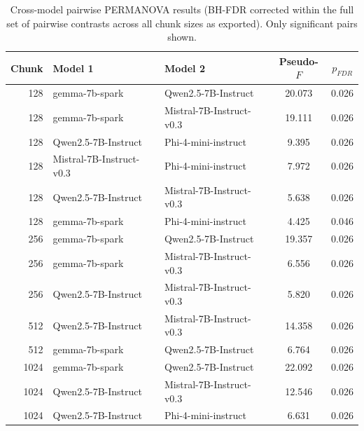 \begin{table}[H]
\centering
\caption{Cross-model pairwise PERMANOVA results (BH-FDR corrected within the full set of pairwise contrasts across all chunk sizes as exported). Only significant pairs shown.}
\label{tab:cross-permanova-pairwise-sig}
\small
\begin{tabular}{rllcc}
\toprule
Chunk & Model 1 & Model 2 & Pseudo-$F$ & $p_{FDR}$ \\
\midrule
128 & gemma-7b-spark & Qwen2.5-7B-Instruct & 20.073 & 0.026 \\
128 & gemma-7b-spark & Mistral-7B-Instruct-v0.3 & 19.111 & 0.026 \\
128 & Qwen2.5-7B-Instruct & Phi-4-mini-instruct & 9.395 & 0.026 \\
128 & Mistral-7B-Instruct-v0.3 & Phi-4-mini-instruct & 7.972 & 0.026 \\
128 & Qwen2.5-7B-Instruct & Mistral-7B-Instruct-v0.3 & 5.638 & 0.026 \\
128 & gemma-7b-spark & Phi-4-mini-instruct & 4.425 & 0.046 \\
256 & gemma-7b-spark & Qwen2.5-7B-Instruct & 19.357 & 0.026 \\
256 & gemma-7b-spark & Mistral-7B-Instruct-v0.3 & 6.556 & 0.026 \\
256 & Qwen2.5-7B-Instruct & Mistral-7B-Instruct-v0.3 & 5.820 & 0.026 \\
512 & Qwen2.5-7B-Instruct & Mistral-7B-Instruct-v0.3 & 14.358 & 0.026 \\
512 & gemma-7b-spark & Qwen2.5-7B-Instruct & 6.764 & 0.026 \\
1024 & gemma-7b-spark & Qwen2.5-7B-Instruct & 22.092 & 0.026 \\
1024 & Qwen2.5-7B-Instruct & Mistral-7B-Instruct-v0.3 & 12.546 & 0.026 \\
1024 & Qwen2.5-7B-Instruct & Phi-4-mini-instruct & 6.631 & 0.026 \\
\bottomrule
\end{tabular}
\end{table}
